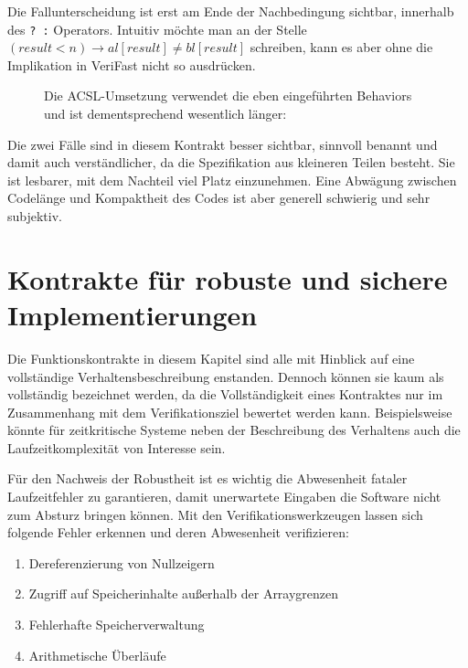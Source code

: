 Die Fallunterscheidung ist erst am Ende der Nachbedingung sichtbar, innerhalb des \lstinline{? :} Operators.
Intuitiv möchte man an der Stelle \((result < n) \rightarrow al[result] \neq  bl[result]\)
schreiben, kann es aber ohne die Implikation in VeriFast nicht so ausdrücken.

\begin{figure}[H]
Die ACSL-Umsetzung verwendet die eben eingeführten Behaviors und ist dementsprechend wesentlich länger:

\end{figure}

Die zwei Fälle sind in diesem Kontrakt besser sichtbar, sinnvoll benannt und damit auch verständlicher, 
da die Spezifikation aus kleineren Teilen besteht. Sie ist lesbarer, mit dem Nachteil viel Platz einzunehmen.
Eine Abwägung zwischen Codelänge und Kompaktheit des Codes ist aber generell schwierig und sehr subjektiv.


\section{Kontrakte für robuste und sichere Implementierungen}
\label{sec:design-by-contract:partielle-korrektheit}

Die Funktionskontrakte in diesem Kapitel sind alle mit Hinblick auf eine vollständige Verhaltensbeschreibung
enstanden. Dennoch können sie kaum als vollständig bezeichnet werden, da die Vollständigkeit eines Kontraktes
nur im Zusammenhang mit dem Verifikationsziel bewertet werden kann. Beispielsweise könnte für zeitkritische
Systeme neben der Beschreibung des Verhaltens auch die Laufzeitkomplexität von Interesse sein.

Für den Nachweis der Robustheit ist es wichtig die Abwesenheit fataler Laufzeitfehler zu garantieren,
damit unerwartete Eingaben die Software nicht zum Absturz bringen können. Mit den Verifikationswerkzeugen lassen 
sich folgende Fehler erkennen und deren Abwesenheit verifizieren:
\begin{enumerate}
\item Dereferenzierung von Nullzeigern
\item Zugriff auf Speicherinhalte außerhalb der Arraygrenzen
\item Fehlerhafte Speicherverwaltung
\item Arithmetische Überläufe
\end{enumerate}

